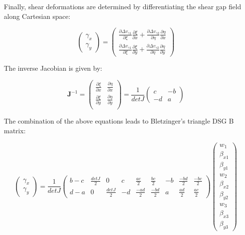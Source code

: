 Finally, shear deformations are determined by differentiating the shear gap field along Cartesian space:

\begin{equation} 
\begin{pmatrix}
\gamma_x \\
\gamma_y 
\end{pmatrix}
=
\begin{pmatrix}
\frac{\partial \Delta v_{\gamma 1}}{\partial \xi}
\frac{\partial \xi}{\partial x}
+
\frac{\partial \Delta v_{\gamma 2}}{\partial \eta}
\frac{\partial \eta}{\partial x} \\
\frac{\partial \Delta v_{\gamma 1}}{\partial \xi}
\frac{\partial \xi}{\partial y}
+
\frac{\partial \Delta v_{\gamma 2}}{\partial \eta}
\frac{\partial \eta}{\partial y}
\end{pmatrix}
\label{DSG_derivation_13}
\end{equation}

The inverse Jacobian is given by:

\begin{equation} 
\mathbf{J}^{-1} = 
\begin{pmatrix}
\frac{\partial \xi}{\partial x} & \frac{\partial \eta}{\partial x} \\
\frac{\partial \xi}{\partial y} & \frac{\partial \eta}{\partial y} \\
\end{pmatrix}
=
\frac{1}{detJ}
\begin{pmatrix}
c & -b \\
-d & a
\end{pmatrix}
\label{DSG_derivation_14}
\end{equation}

The combination of the above equations leads to Bletzinger's \cite{Ble00} triangle DSG B matrix:

\begin{equation} 
\begin{pmatrix}
\gamma_x \\
\gamma_y 
\end{pmatrix}
=
\frac{1}{detJ}
\begin{pmatrix}
b-c & \frac{detJ}{2} & 0 & c & \frac{ac}{2} & \frac{bc}{2} & -b & \frac{-bd}{2} & \frac{-bc}{2} \\
d-a & 0 & \frac{detJ}{2} & -d & \frac{-ad}{2} & \frac{-bd}{2} & a & \frac{ad}{2} & \frac{ac}{2}
\end{pmatrix}
\begin{pmatrix}
w_1 \\
\beta_{x1} \\
\beta_{y1} \\
w_2 \\
\beta_{x2} \\
\beta_{y2} \\
w_3 \\
\beta_{x3} \\
\beta_{y3} 
\end{pmatrix}
\label{DSG_derivation_15}
\end{equation}

